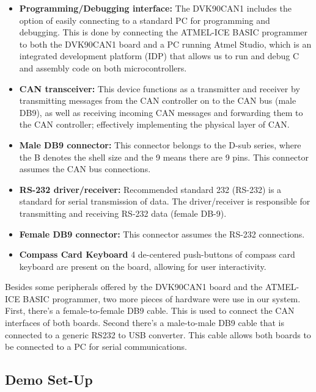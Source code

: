 \begin{itemize}
	\item \textbf{Programming/Debugging interface:} The DVK90CAN1 includes the option of easily connecting to a standard PC for programming and debugging. This is done by connecting the ATMEL-ICE BASIC programmer to both the DVK90CAN1 board and a PC running Atmel Studio, which is an integrated development platform (IDP) that allows us to run and debug C and assembly code on both microcontrollers.
	
	\item \textbf{CAN transceiver:} This device functions as a transmitter and receiver by transmitting messages from the CAN controller on to the CAN bus (male DB9), as well as receiving incoming CAN messages and forwarding them to the CAN controller; effectively implementing the physical layer of CAN.
	
	\item \textbf{Male DB9 connector:} This connector belongs to the D-sub series, where the B denotes the shell size and the 9 means there are 9 pins. This connector assumes the CAN bus connections.
	
	\item \textbf{RS-232 driver/receiver:} Recommended standard 232 (RS-232) is a standard for serial transmission of data. The driver/receiver is responsible for transmitting and receiving RS-232 data (female DB-9).
	
	\item \textbf{Female DB9 connector:} This connector assumes the RS-232 connections.
	
	\item \textbf{Compass Card Keyboard} 4 de-centered push-buttons of compass card keyboard are present on the board, allowing for user interactivity.
\end{itemize}
Besides some peripherals offered by the DVK90CAN1 board and the ATMEL-ICE BASIC programmer, two more pieces of hardware were use in our system. First, there's a female-to-female DB9 cable. This is used to connect the CAN interfaces of both boards. Second there's a male-to-male DB9 cable that is connected to a generic RS232 to USB converter. This cable allows both boards to be connected to a PC for serial communications.

\subsection{Demo Set-Up}
\label{sec:demo_setup}

